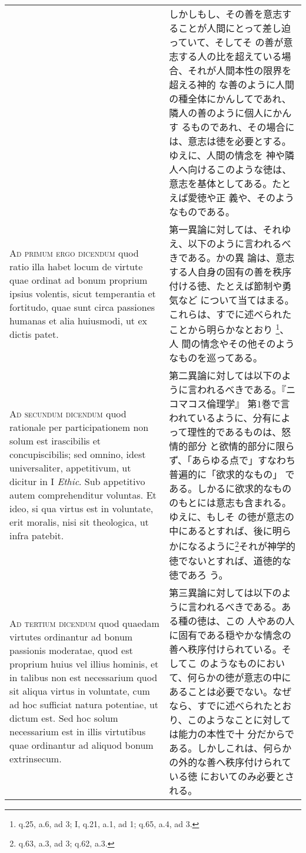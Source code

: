 \documentclass[10pt]{jsarticle}
\begin{document}
\begin{longtable}{p{21em}p{21em}}
&

しかしもし、その善を意志することが人間にとって差し迫っていて、そしてそ
の善が意志する人の比を超えている場合、それが人間本性の限界を超える神的
な善のように人間の種全体にかんしてであれ、隣人の善のように個人にかんす
るものであれ、その場合には、意志は徳を必要とする。ゆえに、人間の情念を
神や隣人へ向けるこのような徳は、意志を基体としてある。たとえば愛徳や正
義や、そのようなものである。
 
\\



{\scshape Ad primum ergo dicendum} quod ratio illa habet locum de
virtute quae ordinat ad bonum proprium ipsius volentis, sicut
temperantia et fortitudo, quae sunt circa passiones humanas et alia
huiusmodi, ut ex dictis patet.


&

 第一異論に対しては、それゆえ、以下のように言われるべきである。かの異
 論は、意志する人自身の固有の善を秩序付ける徳、たとえば節制や勇気など
 について当てはまる。これらは、すでに述べられたことから明らかなとおり
 \footnote{q.25, a.6, ad 3; I, q.21, a.1, ad 1; q.65, a.4, ad 3.}、人
 間の情念やその他そのようなものを巡ってある。
 
\\



{\scshape Ad secundum dicendum} quod rationale per participationem non
solum est irascibilis et concupiscibilis; sed omnino, idest
universaliter, appetitivum, ut dicitur in I {\itshape Ethic}. Sub
appetitivo autem comprehenditur voluntas. Et ideo, si qua virtus est
in voluntate, erit moralis, nisi sit theologica, ut infra patebit.


&

 第二異論に対しては以下のように言われるべきである。『ニコマコス倫理学』
 第1巻で言われているように、分有によって理性的であるものは、怒情的部分
 と欲情的部分に限らず、「あらゆる点で」すなわち普遍的に「欲求的なもの」
 である。しかるに欲求的なもののもとには意志も含まれる。ゆえに、もしそ
 の徳が意志の中にあるとすれば、後に明らかになるように\footnote{q.63,
 a.3, ad 3; q.62, a.3.}それが神学的徳でないとすれば、道徳的な徳であろ
 う。
 
\\



{\scshape Ad tertium dicendum} quod quaedam virtutes ordinantur ad
bonum passionis moderatae, quod est proprium huius vel illius hominis,
et in talibus non est necessarium quod sit aliqua virtus in voluntate,
cum ad hoc sufficiat natura potentiae, ut dictum est. Sed hoc solum
necessarium est in illis virtutibus quae ordinantur ad aliquod bonum
extrinsecum.


&

 第三異論に対しては以下のように言われるべきである。ある種の徳は、この
 人やあの人に固有である穏やかな情念の善へ秩序付けられている。そしてこ
 のようなものにおいて、何らかの徳が意志の中にあることは必要でない。なぜ
 なら、すでに述べられたとおり、このようなことに対しては能力の本性で十
 分だからである。しかしこれは、何らかの外的な善へ秩序付けられている徳
 においてのみ必要とされる。

\end{longtable}
\end{document}
